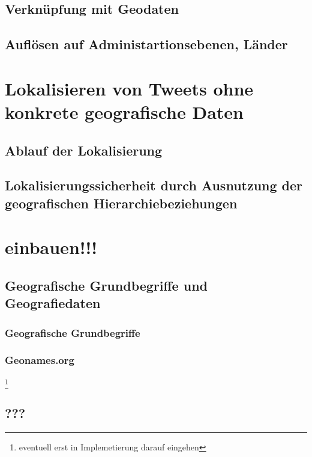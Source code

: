 	\subsection{Verknüpfung mit Geodaten}

	\subsection{Auflösen auf Administartionsebenen, Länder}

\section{Lokalisieren von Tweets ohne konkrete geografische Daten}
	
	\subsection{Ablauf der Lokalisierung}
	
	\subsection{Lokalisierungssicherheit durch Ausnutzung der geografischen Hierarchiebeziehungen}


\section*{einbauen!!!}
\subsection{Geografische Grundbegriffe und Geografiedaten}

		\subsubsection{Geografische Grundbegriffe}

		\subsubsection{Geonames.org} \footnote{eventuell erst in Implemetierung darauf eingehen} 
			

		\subsubsection{}	

	\subsection{???} 
